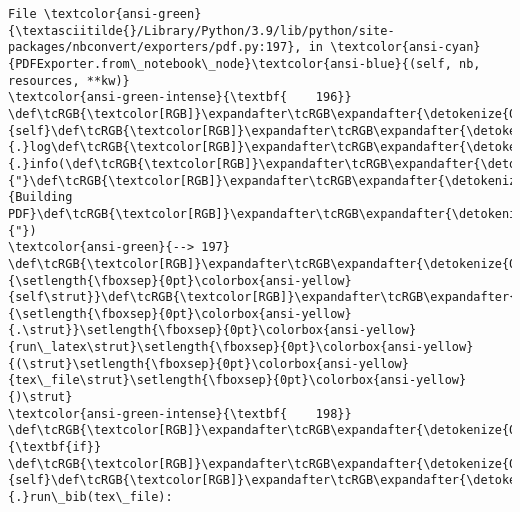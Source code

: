 \documentclass[11pt]{article}
\begin{document}
\begin{Verbatim}[commandchars=\\\{\}, frame=single, framerule=2mm, rulecolor=\color{outerrorbackground}]
File \textcolor{ansi-green}{\textasciitilde{}/Library/Python/3.9/lib/python/site-packages/nbconvert/exporters/pdf.py:197}, in \textcolor{ansi-cyan}{PDFExporter.from\_notebook\_node}\textcolor{ansi-blue}{(self, nb, resources, **kw)}
\textcolor{ansi-green-intense}{\textbf{    196}} \def\tcRGB{\textcolor[RGB]}\expandafter\tcRGB\expandafter{\detokenize{0,135,0}}{self}\def\tcRGB{\textcolor[RGB]}\expandafter\tcRGB\expandafter{\detokenize{98,98,98}}{.}log\def\tcRGB{\textcolor[RGB]}\expandafter\tcRGB\expandafter{\detokenize{98,98,98}}{.}info(\def\tcRGB{\textcolor[RGB]}\expandafter\tcRGB\expandafter{\detokenize{175,0,0}}{"}\def\tcRGB{\textcolor[RGB]}\expandafter\tcRGB\expandafter{\detokenize{175,0,0}}{Building PDF}\def\tcRGB{\textcolor[RGB]}\expandafter\tcRGB\expandafter{\detokenize{175,0,0}}{"})
\textcolor{ansi-green}{--> 197} \def\tcRGB{\textcolor[RGB]}\expandafter\tcRGB\expandafter{\detokenize{0,135,0}}{\setlength{\fboxsep}{0pt}\colorbox{ansi-yellow}{self\strut}}\def\tcRGB{\textcolor[RGB]}\expandafter\tcRGB\expandafter{\detokenize{98,98,98}}{\setlength{\fboxsep}{0pt}\colorbox{ansi-yellow}{.\strut}}\setlength{\fboxsep}{0pt}\colorbox{ansi-yellow}{run\_latex\strut}\setlength{\fboxsep}{0pt}\colorbox{ansi-yellow}{(\strut}\setlength{\fboxsep}{0pt}\colorbox{ansi-yellow}{tex\_file\strut}\setlength{\fboxsep}{0pt}\colorbox{ansi-yellow}{)\strut}
\textcolor{ansi-green-intense}{\textbf{    198}} \def\tcRGB{\textcolor[RGB]}\expandafter\tcRGB\expandafter{\detokenize{0,135,0}}{\textbf{if}} \def\tcRGB{\textcolor[RGB]}\expandafter\tcRGB\expandafter{\detokenize{0,135,0}}{self}\def\tcRGB{\textcolor[RGB]}\expandafter\tcRGB\expandafter{\detokenize{98,98,98}}{.}run\_bib(tex\_file):


\end{Verbatim}
\end{document}

